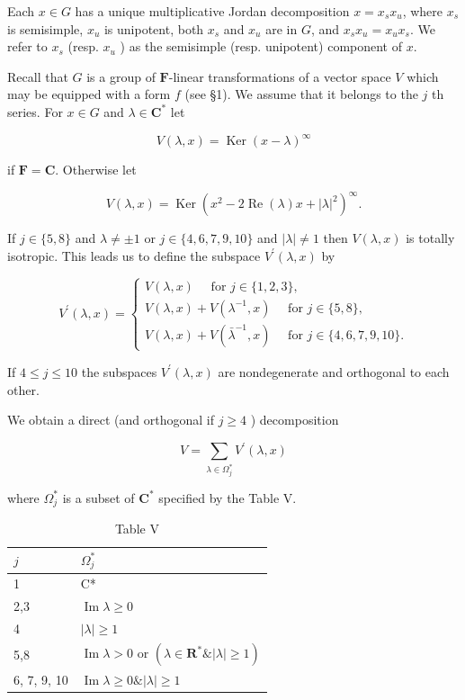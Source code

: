 \documentclass[10pt]{article}
\begin{document}
Each $x \in G$ has a unique multiplicative Jordan decomposition $x=x_{s} x_{u}$, where $x_{s}$ is semisimple, $x_{u}$ is unipotent, both $x_{s}$ and $x_{u}$ are in $G$, and $x_{s} x_{u}=x_{u} x_{s}$. We refer to $x_{s}$ (resp. $x_{u}$ ) as the semisimple (resp. unipotent) component of $x$.

Recall that $G$ is a group of $\mathbf{F}$-linear transformations of a vector space $V$ which may be equipped with a form $f$ (see §1). We assume that it belongs to the $j$ th series. For $x \in G$ and $\lambda \in \mathbf{C}^{*}$ let

$$
V(\lambda, x)=\operatorname{Ker}(x-\lambda)^{\infty}
$$

if $\mathbf{F}=\mathbf{C}$. Otherwise let

$$
V(\lambda, x)=\operatorname{Ker}\left(x^{2}-2 \operatorname{Re}(\lambda) x+|\lambda|^{2}\right)^{\infty} .
$$

If $j \in\{5,8\}$ and $\lambda \neq \pm 1$ or $j \in\{4,6,7,9,10\}$ and $|\lambda| \neq 1$ then $V(\lambda, x)$ is totally isotropic. This leads us to define the subspace $V^{\prime}(\lambda, x)$ by

$$
V^{\prime}(\lambda, x)=\left\{\begin{array}{l}
V(\lambda, x) \quad \text { for } j \in\{1,2,3\}, \\
V(\lambda, x)+V\left(\lambda^{-1}, x\right) \quad \text { for } j \in\{5,8\}, \\
V(\lambda, x)+V\left(\bar{\lambda}^{-1}, x\right) \quad \text { for } j \in\{4,6,7,9,10\} .
\end{array}\right.
$$

If $4 \leqslant j \leqslant 10$ the subspaces $V^{\prime}(\lambda, x)$ are nondegenerate and orthogonal to each other.

We obtain a direct (and orthogonal if $j \geqslant 4$ ) decomposition


\begin{equation*}
V=\sum_{\lambda \in \Omega_{j}^{*}} V^{\prime}(\lambda, x) \tag{13.1}
\end{equation*}


where $\Omega_{j}^{*}$ is a subset of $\mathbf{C}^{*}$ specified by the Table V.

\begin{table}[h]
\begin{center}
\begin{tabular}[t]{|l|l|}
\hline
$j$ & $\Omega_{j}^{*}$ \\
\hline
1 & C* \\
\hline
2,3 & $\operatorname{Im} \lambda \geqslant 0$ \\
\hline
4 & $|\lambda| \geqslant 1$ \\
\hline
5,8 & $\operatorname{Im} \lambda>0$ or $\left(\lambda \in \mathbf{R}^{*} \&|\lambda| \geqslant 1\right)$ \\
\hline
6, 7, 9, 10 & $\operatorname{Im} \lambda \geqslant 0 \&|\lambda| \geqslant 1$ \\
\hline
\end{tabular}
\captionsetup{labelformat=empty}
\caption{Table V}
\end{center}
\end{table}
\end{document}
